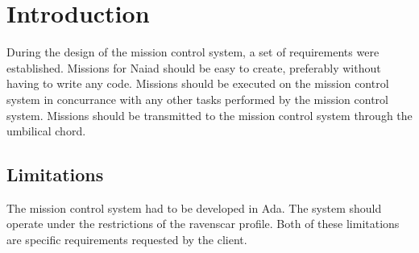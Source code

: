 \section{Introduction}\label{sec:introduction}
During the design of the mission control system, a set of requirements were established. Missions for Naiad should be easy to create, preferably without having to write any code. Missions should be executed on the mission control system in concurrance with any other tasks performed by the mission control system. Missions should be transmitted to the mission control system through the umbilical chord.

\subsection{Limitations}
The mission control system had to be developed in Ada. The system should operate under the restrictions of the ravenscar profile. Both of these limitations are specific requirements requested by the client.